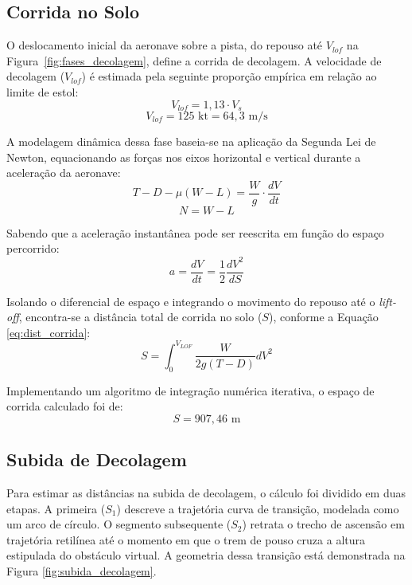 \subsection{Corrida no Solo}
O deslocamento inicial da aeronave sobre a pista, do repouso até $V_{lof}$ na Figura~\ref{fig:fases_decolagem}, define a corrida de decolagem. A velocidade de decolagem ($V_{lof}$) é estimada pela seguinte proporção empírica em relação ao limite de estol:
\begin{equation}
    V_{lof} = 1,13 \cdot V_{s}
\end{equation}
\begin{equation}
    V_{lof} = 125 \text{ kt}= 64,3 \text{ m/s}
\end{equation}

A modelagem dinâmica dessa fase baseia-se na aplicação da Segunda Lei de Newton, equacionando as forças nos eixos horizontal e vertical durante a aceleração da aeronave:
\begin{equation}
    T - D - \mu(W - L) = \frac{W}{g} \cdot \frac{dV}{dt}
\end{equation}
\begin{equation}
    N = W - L
\end{equation}

Sabendo que a aceleração instantânea pode ser reescrita em função do espaço percorrido:
\begin{equation}
    a = \frac{dV}{dt} = \frac{1}{2}\frac{dV^{2}}{dS}
\end{equation}

Isolando o diferencial de espaço e integrando o movimento do repouso até o \textit{lift-off}, encontra-se a distância total de corrida no solo ($S$), conforme a Equação \ref{eq:dist_corrida}:
\begin{equation}
    S = \int_{0}^{V_{LOF}} \frac{W}{2g(T - D)} dV^{2}
    \label{eq:dist_corrida}
\end{equation}

Implementando um algoritmo de integração numérica iterativa, o espaço de corrida calculado foi de:
\begin{equation}
    S = 907,46 \text{ m}
\end{equation}

\subsection{Subida de Decolagem}
Para estimar as distâncias na subida de decolagem, o cálculo foi dividido em duas etapas. A primeira ($S_{1}$) descreve a trajetória curva de transição, modelada como um arco de círculo. O segmento subsequente ($S_{2}$) retrata o trecho de ascensão em trajetória retilínea até o momento em que o trem de pouso cruza a altura estipulada do obstáculo virtual. A geometria dessa transição está demonstrada na Figura \ref{fig:subida_decolagem}.

